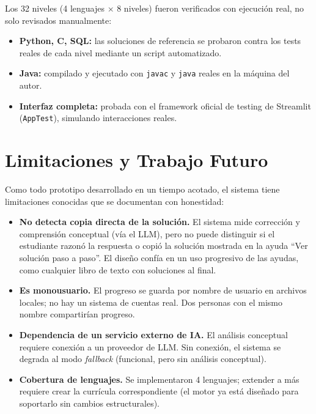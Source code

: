 \documentclass[11pt,letterpaper]{article}
\begin{document}
Los 32 niveles (4 lenguajes $\times$ 8 niveles) fueron verificados con
ejecución real, no solo revisados manualmente:
\begin{itemize}[leftmargin=*]
  \item \textbf{Python, C, SQL:} las soluciones de referencia se
  probaron contra los tests reales de cada nivel mediante un script
  automatizado.
  \item \textbf{Java:} compilado y ejecutado con \texttt{javac} y
  \texttt{java} reales en la máquina del autor.
  \item \textbf{Interfaz completa:} probada con el framework oficial
  de testing de Streamlit (\texttt{AppTest}), simulando interacciones
  reales.
\end{itemize}

\section{Limitaciones y Trabajo Futuro}

Como todo prototipo desarrollado en un tiempo acotado, el sistema tiene
limitaciones conocidas que se documentan con honestidad:

\begin{itemize}[leftmargin=*]
  \item \textbf{No detecta copia directa de la solución.} El sistema
  mide corrección y comprensión conceptual (vía el LLM), pero no puede
  distinguir si el estudiante razonó la respuesta o copió la solución
  mostrada en la ayuda ``Ver solución paso a paso''. El diseño confía
  en un uso progresivo de las ayudas, como cualquier libro de texto con
  soluciones al final.
  \item \textbf{Es monousuario.} El progreso se guarda por nombre de
  usuario en archivos locales; no hay un sistema de cuentas real. Dos
  personas con el mismo nombre compartirían progreso.
  \item \textbf{Dependencia de un servicio externo de IA.} El análisis
  conceptual requiere conexión a un proveedor de LLM. Sin conexión, el
  sistema se degrada al modo \textit{fallback} (funcional, pero sin
  análisis conceptual).
  \item \textbf{Cobertura de lenguajes.} Se implementaron 4 lenguajes;
  extender a más requiere crear la currícula correspondiente (el motor
  ya está diseñado para soportarlo sin cambios estructurales).
\end{itemize}
\end{document}
